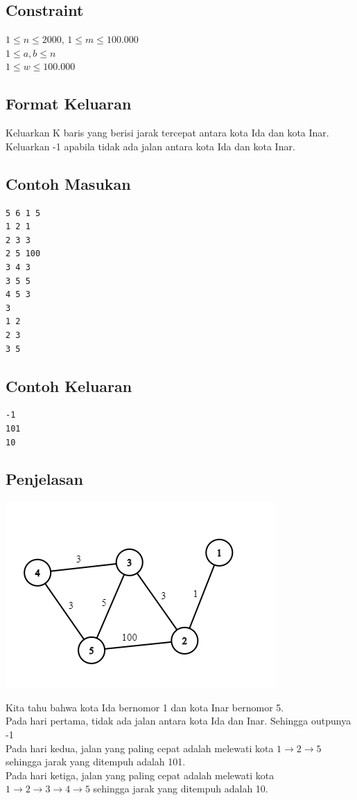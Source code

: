 \documentclass{article}
\begin{document}
\subsection*{Constraint}
$1 \leq n \leq 2000$, $1 \leq m \leq 100.000$\\
$1 \leq a,b \leq n$\\
$1 \leq w \leq 100.000$\\
\subsection*{Format Keluaran}

Keluarkan K baris yang berisi jarak tercepat antara kota Ida dan kota Inar. Keluarkan -1 apabila tidak ada jalan antara kota Ida dan kota Inar.
\begin{multicols}{2}
\subsection*{Contoh Masukan}
\begin{lstlisting}
5 6 1 5
1 2 1
2 3 3
2 5 100
3 4 3
3 5 5
4 5 3
3
1 2
2 3
3 5
\end{lstlisting}
\columnbreak
\subsection*{Contoh Keluaran}
\begin{lstlisting}
-1
101
10
\end{lstlisting}
\vfill
\null
\end{multicols}





\pagebreak
\subsection*{Penjelasan}
\begin{center}
 \includegraphics[scale=1.0]{graph_shortest.png}

\end{center}
Kita tahu bahwa kota Ida bernomor 1 dan kota Inar bernomor 5.\\
Pada hari pertama, tidak ada jalan antara kota Ida dan Inar. Sehingga outpunya -1\\
Pada hari kedua, jalan yang paling cepat adalah melewati kota $1 \rightarrow 2 \rightarrow 5$ sehingga jarak yang ditempuh adalah 101.\\ 
Pada hari ketiga, jalan yang paling cepat adalah melewati kota $1 \rightarrow 2 \rightarrow 3 \rightarrow 4 \rightarrow 5$ sehingga jarak yang ditempuh adalah 10.
\end{document}
